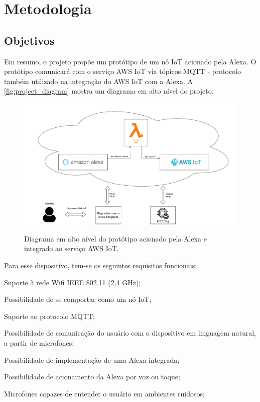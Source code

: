 \chapter{Metodologia}\label{chapter:metodologia}

\section{Objetivos}

Em resumo, o projeto propõe um protótipo de um nó IoT acionado pela Alexa. O protótipo comunicará com o serviço AWS IoT via tópicos MQTT - protocolo também utilizado na integração do AWS IoT com a Alexa. A \autoref{fig:project_diagram} mostra um diagrama em alto nível do projeto.

\begin{figure}[htbp]
    \centering
    \caption{Diagrama em alto nível do protótipo acionado pela Alexa e integrado ao serviço AWS IoT.}
    \includegraphics[scale=0.47]{Imagens/project_diagram.pdf}
    \label{fig:project_diagram}
\end{figure}

Para esse dispositivo, tem-se os seguintes requisitos funcionais:

\begin{alineas}
    \item Suporte à rede Wifi IEEE 802.11 (2,4 GHz);
    \item Possibilidade de se comportar como um nó IoT;
    \item Suporte ao protocolo MQTT;
    \item Possibilidade de comunicação do usuário com o dispositivo em linguagem natural, a partir de microfones;
    \item Possibilidade de implementação de uma Alexa integrada;
    \item Possibilidade de acionamento da Alexa por voz ou toque;
    \item Microfones capazes de entender o usuário em ambientes ruidosos;
\end{alineas}

